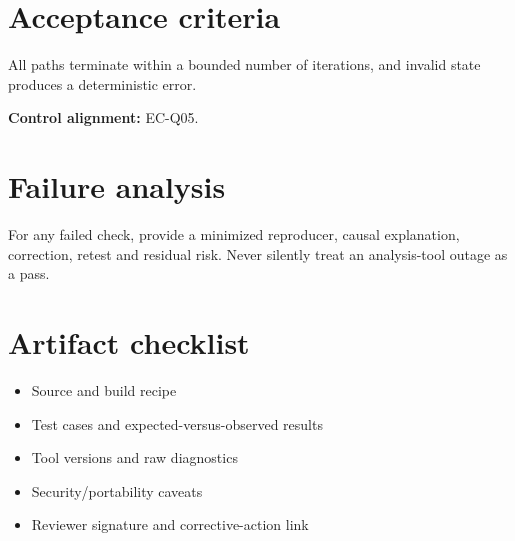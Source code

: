 \documentclass[10pt,letterpaper]{article}
\begin{document}
\section{Acceptance criteria}
All paths terminate within a bounded number of iterations, and invalid state produces a deterministic error.

\textbf{Control alignment:} EC-Q05.
\section{Failure analysis}
For any failed check, provide a minimized reproducer, causal explanation, correction, retest and residual risk. Never silently treat an analysis-tool outage as a pass.
\section{Artifact checklist}
\begin{itemize}
\item Source and build recipe
\item Test cases and expected-versus-observed results
\item Tool versions and raw diagnostics
\item Security/portability caveats
\item Reviewer signature and corrective-action link
\end{itemize}
\end{document}
